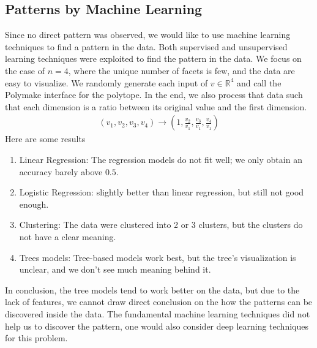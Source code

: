 \documentclass[12pt,letterpaper]{article}
\newcommand*{\R}{\mathbb{R}}
\begin{document}
\subsection{Patterns by Machine Learning}
Since no direct pattern was observed, we would like to use machine learning techniques to find a pattern in the data.
Both supervised and unsupervised learning techniques were exploited to find the pattern in the data. 
We focus on the case of $n = 4$, where the unique number of facets is few, and the data are easy to visualize.
We randomly generate each input of $v \in \R^4$ and call the Polymake interface for the polytope. In the end, 
we also process that data such that each dimension is a ratio between its original value and the first dimension. 
\begin{align*}
 (v_1, v_2, v_3, v_4) \rightarrow \left(1, \frac{v_2}{v_1}, \frac{v_3}{v_1}, \frac{v_4}{v_1} \right)
\end{align*}
Here are some results
\begin{enumerate}
    \item Linear Regression: The regression models do not fit well; we only obtain an accuracy barely above $0.5$.
    \item Logistic Regression: slightly better than linear regression, but still not good enough.
    \item Clustering: The data were clustered into 2 or 3 clusters, but the clusters do not have a clear meaning.
    \item Trees models: Tree-based models work best, but the tree's visualization is unclear, and we don't see much meaning behind it.
\end{enumerate}
In conclusion, the tree models tend to work better on the data, but due to the lack of features,
we cannot draw direct conclusion on the how the patterns can be discovered inside the data.
The fundamental machine learning techniques did not help us to discover the pattern, one 
would also consider deep learning techniques for this problem.
\end{document}
